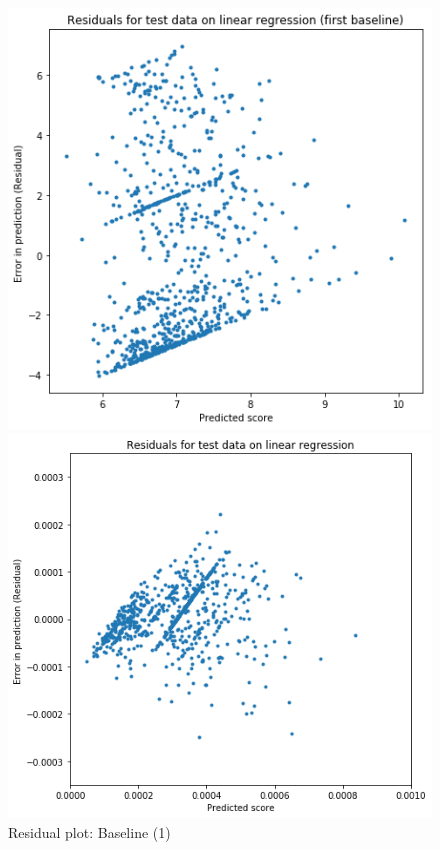 \documentclass[a4paper, 11pt]{article}
\begin{document}
\begin{figure}[!htb]
  \includegraphics[width=\linewidth]{residual_first_baseline.png}
     \caption{Residual plot: Baseline (1)}
    \label{fig:residual_first_baseline}
\endminipage\hfill
{}
    \includegraphics[width=\linewidth]{residual_second_baseline.png}

\end{figure}
\end{document}
